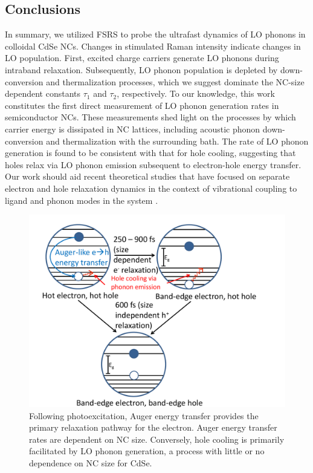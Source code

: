 \subsection{Conclusions}
In summary, we utilized FSRS to probe the ultrafast dynamics of LO phonons in colloidal CdSe NCs. Changes in stimulated Raman intensity indicate changes in LO population. First, excited charge carriers generate LO phonons during intraband relaxation. Subsequently, LO phonon population is depleted by down-conversion and thermalization processes, which we suggest dominate the NC-size dependent constants $\tau_1$ and $\tau_2$, respectively.  To our knowledge, this work constitutes the first direct measurement of LO phonon generation rates in semiconductor NCs. These measurements shed light on the processes by which carrier energy is dissipated in NC lattices, including acoustic phonon down-conversion and thermalization with the surrounding bath. The rate of LO phonon generation is found to be consistent with that for hole cooling, suggesting that holes relax via LO phonon emission subsequent to electron-hole energy transfer. Our work should aid recent theoretical studies that have focused on separate electron and hole relaxation dynamics in the context of vibrational coupling to ligand and phonon modes in the system \cite{doi:10.1021/jp206594e}.

\begin{figure}
\begin{center}
\includegraphics[width=\textwidth]{./Chapter2/fsrs4.pdf}
\caption[Schematic depiction of carrier thermalization in CdSe NCs.]{Following photoexcitation, Auger energy transfer provides the primary relaxation pathway for the electron. Auger energy transfer rates are dependent on NC size. Conversely, hole cooling is primarily facilitated by LO phonon generation, a process with little or no dependence on NC size for CdSe.}
\label{f:fsrs4}
\end{center}
\end{figure}

